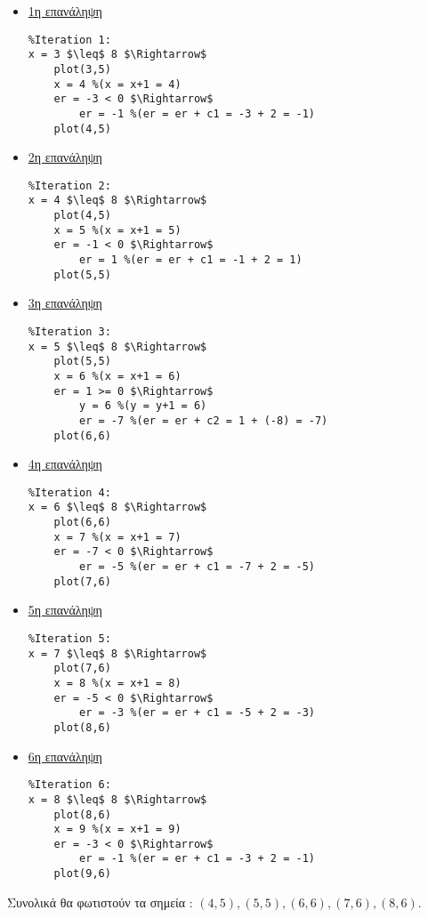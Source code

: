 \begin{solution}
\begin{enumerate}
\begin{itemize}
\item \underline{1η επανάληψη}

\begin{lstlisting}
%Iteration 1:
x = 3 $\leq$ 8 $\Rightarrow$
    plot(3,5)
    x = 4 %(x = x+1 = 4)
    er = -3 < 0 $\Rightarrow$
        er = -1 %(er = er + c1 = -3 + 2 = -1)
    plot(4,5)
\end{lstlisting}

\item \underline{2η επανάληψη}

		\begin{lstlisting}
%Iteration 2:
x = 4 $\leq$ 8 $\Rightarrow$
    plot(4,5)
    x = 5 %(x = x+1 = 5)
    er = -1 < 0 $\Rightarrow$
        er = 1 %(er = er + c1 = -1 + 2 = 1)
    plot(5,5)
\end{lstlisting}

\item \underline{3η επανάληψη}

		\begin{lstlisting}
%Iteration 3:
x = 5 $\leq$ 8 $\Rightarrow$
    plot(5,5)
    x = 6 %(x = x+1 = 6)
    er = 1 >= 0 $\Rightarrow$
        y = 6 %(y = y+1 = 6)
        er = -7 %(er = er + c2 = 1 + (-8) = -7)
    plot(6,6)
\end{lstlisting}

\item \underline{4η επανάληψη}

		\begin{lstlisting}
%Iteration 4:
x = 6 $\leq$ 8 $\Rightarrow$
    plot(6,6)
    x = 7 %(x = x+1 = 7)
    er = -7 < 0 $\Rightarrow$
        er = -5 %(er = er + c1 = -7 + 2 = -5)
    plot(7,6)
\end{lstlisting}

\item \underline{5η επανάληψη}

		\begin{lstlisting}
%Iteration 5:
x = 7 $\leq$ 8 $\Rightarrow$
    plot(7,6)
    x = 8 %(x = x+1 = 8)
    er = -5 < 0 $\Rightarrow$
        er = -3 %(er = er + c1 = -5 + 2 = -3)
    plot(8,6)
\end{lstlisting}

\item \underline{6η επανάληψη}
\begin{lstlisting}
%Iteration 6:
x = 8 $\leq$ 8 $\Rightarrow$
    plot(8,6)
    x = 9 %(x = x+1 = 9)
    er = -3 < 0 $\Rightarrow$
        er = -1 %(er = er + c1 = -3 + 2 = -1)
    plot(9,6)
\end{lstlisting}

\end{itemize}

Συνολικά θα φωτιστούν τα σημεία : $(4, 5), (5, 5), (6, 6), (7,6), (8,6)$.	

\end{enumerate}
	
\end{solution}